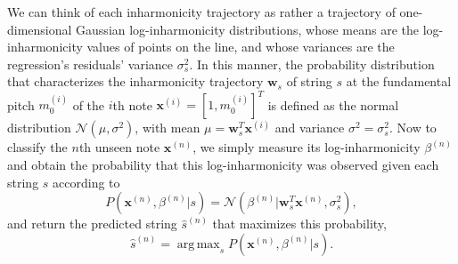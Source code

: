 \documentclass[12pt]{cmuthesis}
\DeclareMathOperator*{\argmax}{arg\,max}
\begin{document}
We can think of each inharmonicity trajectory as rather a trajectory of one-dimensional Gaussian log-inharmonicity distributions, whose means are the log-inharmonicity values of points on the line, and whose variances are the regression's residuals' variance $\sigma_s^2$. In this manner, the probability distribution that characterizes the inharmonicity trajectory $\mathbf{w}_s$ of string $s$ at the fundamental pitch $m_0^{(i)}$ of the $i$th note $\mathbf{x}^{(i)} = [1,m_0^{(i)}]^T$ is defined as the normal distribution $\mathcal{N}(\mu, \sigma^2)$, with mean $\mu = \mathbf{w}_s^T\mathbf{x}^{(i)}$ and variance $\sigma^2 = \sigma_s^2$. Now to classify the $n$th unseen note $\mathbf{x}^{(n)}$, we simply measure its log-inharmonicity $\beta^{(n)}$ and obtain the probability that this log-inharmonicity was observed given each string $s$ according to
\begin{equation}
P(\mathbf{x}^{(n)},\beta^{(n)} | s) = \mathcal{N}(\beta^{(n)} | \mathbf{w}_s^T\mathbf{x}^{(n)},\sigma_s^2),
\end{equation}
and return the predicted string $\hat{s}^{(n)}$ that maximizes this probability,
\begin{equation}
\hat{s}^{(n)} = \argmax_{s}P(\mathbf{x}^{(n)},\beta^{(n)} | s).
\label{eq:string-argmax}
\end{equation}

 


\end{document}

